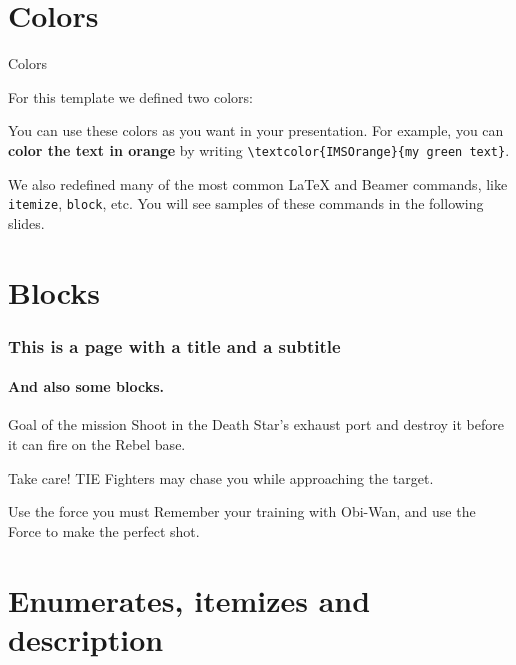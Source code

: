 \documentclass[usenames,dvipsnames,10pt,aspectratio=169]{beamer}
\begin{document}
\section{Colors}

\begin{frame}{Colors}

For this template we defined two colors:

\vskip 0.5cm

You can use these colors as you want in your presentation. For example, you can \textbf{\textcolor{IMSOrange}{color the text in orange}} by writing \texttt{\textbackslash textcolor\{IMSOrange\}\{my green text\}}.

\vskip 0.5cm

We also redefined many of the most common \LaTeX{} and Beamer commands, like \texttt{itemize}, \texttt{block}, etc. You will see samples of these commands in the following slides.

\end{frame}

\section{Blocks}

\begin{frame} 
\frametitle{This is a page with a title and a subtitle} 
\framesubtitle{And also some blocks.} 
\begin{block}{Goal of the mission}
Shoot in the Death Star's exhaust port and destroy it before it can fire on the Rebel base.
\end{block} 
\begin{alertblock}{Take care!}
TIE Fighters may chase you while approaching the target.
\end{alertblock} 
\begin{exampleblock}{Use the force you must}
Remember your training with Obi-Wan, and use the Force to make the perfect shot.
\end{exampleblock} 

\end{frame}

\section{Enumerates, itemizes and description}
\end{document}
